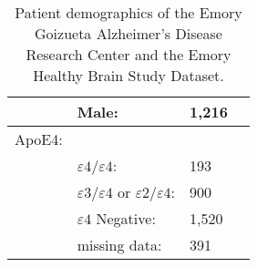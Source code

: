 \documentclass{interact}
\theoremstyle{plain}
\theoremstyle{definition}
\theoremstyle{remark}
\begin{document}
\begin{table}[H]
{\begin{tabular}{l l l l}
        &Male: & 1,216\\
        \midrule
        ApoE4: &&\\
        &$\varepsilon4/\varepsilon4$: & 193 \\
        &$\varepsilon3/\varepsilon4$ or $\varepsilon2/\varepsilon4$: & 900 \\
        &$\varepsilon4$ Negative: & 1,520\\
        & missing data:& 391 \\
        \bottomrule
        \end{tabular}
        }
        \caption{Patient demographics of the Emory Goizueta Alzheimer's Disease Research Center and the Emory Healthy Brain Study Dataset.}\label{real_demo}
    \end{table}
    
\pagebreak 
\end{document}
